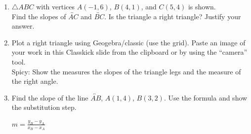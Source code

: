 \begin{enumerate}
\item $\triangle ABC$ with vertices $A(-1,6)$, $B(4,1)$, and $C(5,4)$ is shown. \\[0.5cm]
Find the slopes of $\overleftrightarrow{AC}$ and $\overleftrightarrow{BC}$. Is the triangle a right triangle? Justify your answer.
  \begin{flushright}
    \end{flushright}

\item Plot a right triangle using Geogebra/classic (use the grid). Paste an image of your work in this Classkick slide from the clipboard or by using the ``camera'' tool.\\[0.25cm]
Spicy: Show the measures the slopes of the triangle legs and the measure of the right angle.

\item Find the slope of the line $\overleftrightarrow{AB}$, $A(1,4)$, $B(3,2)$. Use the formula and show the substitution step.
\begin{multicols}{2}
  $\displaystyle m = \frac{y_B - y_A}{x_B - x_A}$
    \vspace{2cm}
    \begin{flushright}
    \end{flushright}
\end{multicols}


\end{enumerate}
